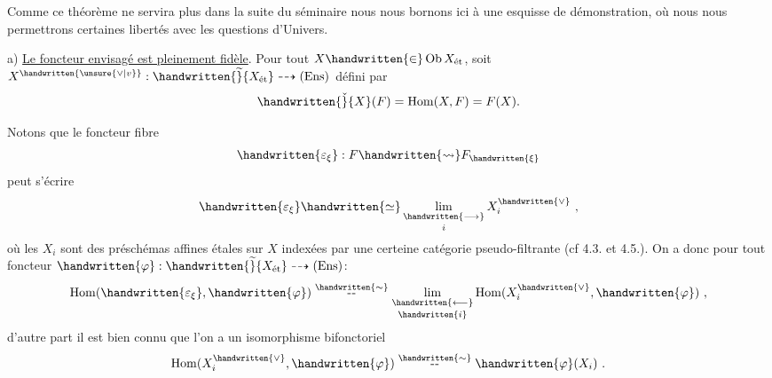 Comme ce théorème ne servira plus dans la suite du séminaire nous nous bornons ici à une esquisse de démonstration, où nous nous permettrons certaines libertés avec les questions d'Univers.

a) \uline{Le foncteur envisagé est pleinement fidèle}. Pour tout $X\handwritten{\in}\operatorname{Ob} X_{\text{ét}}$, soit $X^{\handwritten{\unsure{\vee|v}}}: \handwritten{\widetilde}{X_{\text{ét}}} \dashrightarrow (\mathrm{Ens})$ défini par
\[
\handwritten{\check}{X}(F) = \operatorname{Hom}(X,F) = F(X).
\]

\noindent Notons que le foncteur fibre
\[
\handwritten{\varepsilon_{\xi}} : F \handwritten{\rightsquigarrow} F_{\handwritten{\xi}}
\]
peut s'écrire
\[
\handwritten{\varepsilon_{\xi}} \handwritten{\simeq} \mathop{\underset{\handwritten{\longrightarrow}}{\mathrm{lim}}}\limits_i X_i^{\handwritten{\vee}}\ ,
\]
où les $X_i$ sont des préschémas affines étales sur $X$ indexées par une certeine catégorie pseudo-filtrante (cf 4.3. et 4.5.). On a donc pour tout foncteur $\handwritten{\varphi}: \handwritten{\widetilde}{X_{\text{ét}}} \dashrightarrow (\mathrm{Ens})$:
\[
\operatorname{Hom}(\handwritten{\varepsilon_{\xi}},\handwritten{\varphi}) \mathrel{\mathop{\text{-\kern.04em-}}\limits^{\handwritten{\sim}}} \mathop{\underset{\handwritten{\longleftarrow}}{\mathrm{lim}}}\limits_{\handwritten{i}} \operatorname{Hom}(X_i^{\handwritten{\vee}},\handwritten{\varphi})\ ,
\]
d'autre part il est bien connu que l'on a un isomorphisme bifonctoriel
\[
\operatorname{Hom}(X_i^{\handwritten{\vee}},\handwritten{\varphi}) \mathrel{\mathop{\text{-\kern.04em-}}\limits^{\handwritten{\sim}}} \handwritten{\varphi}(X_i)\ .
\]

\endgroup



